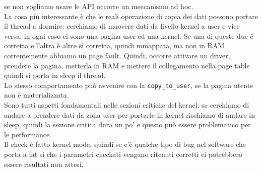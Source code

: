 \documentclass[12pt, oneside]{extbook}
\begin{document}
se non vogliamo usare le API occorre un meccanismo ad hoc.\\La cosa più interessante è che le reali operazione di copia dei dati possono portare il thread a dormire: cerchiamo di muovere dati da livello kernel a user e vice versa, in ogni caso ci sono una pagina user ed una kernel. Se una di queste due è corretta e l'altra è altre sì corretta, quindi mmappata, ma non in RAM correntemente abbiamo un page fault. Quindi, occorre attivare un driver, prendere la pagina, metterla in RAM e mettere il collegamento nella page table quindi si porta in sleep il thread.\\Lo stesso comportamento può avvenire con la \texttt{copy\_to\_user}, se la pagina utente non è materializzata.\\Sono tutti aspetti fondamentali nelle sezioni critiche del kernel: se cerchiamo di andare a prendere dati da zona user per portarle in kernel rischiamo di andare in sleep, quindi la sezione critica dura un po' e questo può essere problematico per le performance.\\Il check è fatto kernel mode, quindi se c'è qualche tipo di bug nel software che porta a fat si che i parametri checkati vengano ritenuti corretti ci potrebbero essere risultati non attesi.
\end{document}
